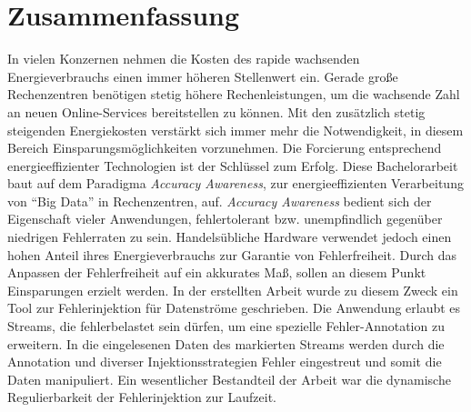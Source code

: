 {} %
\chapter*{Zusammenfassung}

In vielen Konzernen nehmen die Kosten des rapide wachsenden Energieverbrauchs einen immer h\"oheren Stellenwert ein. Gerade gro\ss e Rechenzentren ben\"otigen stetig h\"ohere Rechenleistungen, um die wachsende Zahl an neuen Online-Services bereitstellen zu k\"onnen. Mit den zus\"atzlich stetig steigenden Energiekosten verst\"arkt sich immer mehr die Notwendigkeit, in diesem Bereich Einsparungsm\"oglichkeiten vorzunehmen. Die Forcierung entsprechend energieeffizienter Technologien ist der Schl\"ussel zum Erfolg. Diese Bachelorarbeit baut auf dem Paradigma \textit{Accuracy Awareness}, zur energieeffizienten Verarbeitung von ``Big Data'' in Rechenzentren, auf. \textit{Accuracy Awareness} bedient sich der Eigenschaft vieler Anwendungen,  fehlertolerant bzw. unempfindlich gegen\"uber niedrigen Fehlerraten zu sein. Handels\"ubliche Hardware verwendet jedoch einen hohen Anteil ihres Energieverbrauchs zur Garantie von Fehlerfreiheit. Durch das Anpassen der Fehlerfreiheit auf ein akkurates Ma\ss, sollen an diesem Punkt Einsparungen erzielt werden. In der erstellten Arbeit wurde zu diesem Zweck ein Tool zur Fehlerinjektion f\"ur Datenströme geschrieben. Die Anwendung erlaubt es Streams, die fehlerbelastet sein d\"urfen, um eine spezielle Fehler-Annotation zu erweitern. In die eingelesenen Daten des markierten Streams werden durch die Annotation und diverser Injektionsstrategien Fehler eingestreut und somit die Daten manipuliert. Ein wesentlicher Bestandteil der Arbeit war die dynamische Regulierbarkeit der Fehlerinjektion zur Laufzeit.

\bigskip

